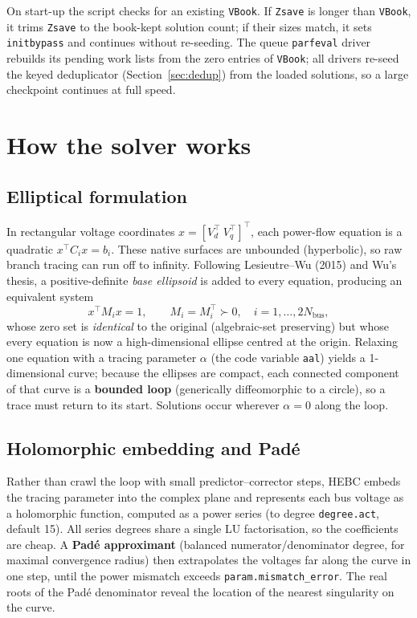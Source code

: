 \documentclass[11pt,a4paper]{article}
\newcommand{\code}[1]{\texttt{#1}}
\begin{document}
On start-up the script checks for an existing \code{VBook}. If \code{Zsave} is longer than
\code{VBook}, it trims \code{Zsave} to the book-kept solution count; if their sizes match,
it sets \code{initbypass} and continues without re-seeding. The queue \code{parfeval} driver
rebuilds its pending work lists from the zero entries of \code{VBook}; all drivers re-seed
the keyed deduplicator (Section~\ref{sec:dedup}) from the loaded solutions, so a large
checkpoint continues at full speed.

\section{How the solver works}

\subsection{Elliptical formulation}
In rectangular voltage coordinates $x=[V_d^\top\ V_q^\top]^\top$, each power-flow
equation is a quadratic $x^\top C_i x = b_i$. These native surfaces are unbounded
(hyperbolic), so raw branch tracing can run off to infinity. Following
Lesieutre--Wu (2015) and Wu's thesis, a positive-definite \emph{base
ellipsoid} is added to every equation, producing an equivalent system
\[
  x^\top M_i x = 1, \qquad M_i = M_i^\top \succ 0, \quad i=1,\dots,2N_{\text{bus}},
\]
whose zero set is \emph{identical} to the original (algebraic-set preserving) but whose
every equation is now a high-dimensional ellipse centred at the origin. Relaxing one
equation with a tracing parameter $\alpha$ (the code variable \code{aal}) yields a
1-dimensional curve; because the ellipses are compact, each connected component of that
curve is a \textbf{bounded loop} (generically diffeomorphic to a circle), so a trace must
return to its start. Solutions occur wherever $\alpha=0$ along the loop.

\subsection{Holomorphic embedding and Pad\'e}
Rather than crawl the loop with small predictor--corrector steps, HEBC embeds the tracing
parameter into the complex plane and represents each bus voltage as a holomorphic
function, computed as a power series (to degree \code{degree.act}, default 15). All
series degrees share a single LU factorisation, so the coefficients are cheap. A
\textbf{Pad\'e approximant} (balanced numerator/denominator degree, for maximal
convergence radius) then extrapolates the voltages far along the curve in one step, until
the power mismatch exceeds \code{param.mismatch_error}. The real roots of the Pad\'e
denominator reveal the location of the nearest singularity on the curve.
\end{document}
